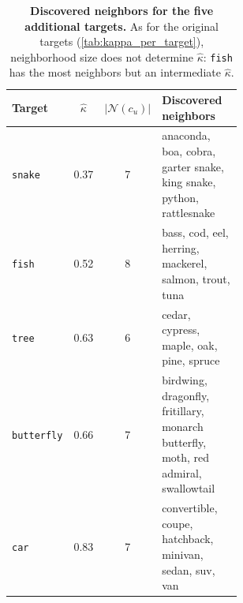 \begin{table}[htbp]
\centering
\small
\setlength{\tabcolsep}{6pt}
\begin{tabular}{lccp{0.58\linewidth}}
\toprule
\textbf{Target} & $\hat\kappa$ & $|\mathcal{N}(c_u)|$ & \textbf{Discovered neighbors} \\
\midrule
\texttt{snake}     & 0.37 & 7 & anaconda, boa, cobra, garter snake, king snake, python, rattlesnake \\
\texttt{fish}      & 0.52 & 8 & bass, cod, eel, herring, mackerel, salmon, trout, tuna \\
\texttt{tree}      & 0.63 & 6 & cedar, cypress, maple, oak, pine, spruce \\
\texttt{butterfly} & 0.66 & 7 & birdwing, dragonfly, fritillary, monarch butterfly, moth, red admiral, swallowtail \\
\texttt{car}       & 0.83 & 7 & convertible, coupe, hatchback, minivan, sedan, suv, van \\
\bottomrule
\end{tabular}
\caption{\textbf{Discovered neighbors for the five additional targets.} As for the original targets (\cref{tab:kappa_per_target}), neighborhood size does not determine $\hat\kappa$: \texttt{fish} has the most neighbors but an intermediate $\hat\kappa$.}
\label{tab:new_concept_neighbors}
\end{table}
